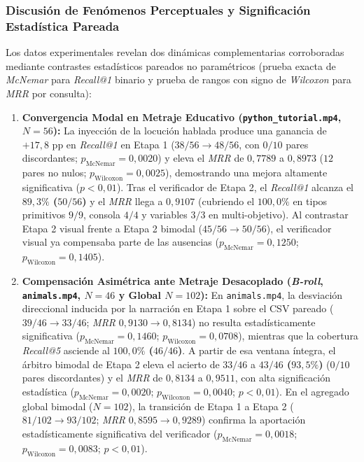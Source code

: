 \subsubsection{Discusión de Fenómenos Perceptuales y Significación Estadística Pareada}
Los datos experimentales revelan dos dinámicas complementarias corroboradas mediante contrastes estadísticos pareados no paramétricos (prueba exacta de \textit{McNemar} para \textit{Recall@1} binario y prueba de rangos con signo de \textit{Wilcoxon} para \textit{MRR} por consulta):
\begin{enumerate}
    \item \textbf{Convergencia Modal en Metraje Educativo (\texttt{python\_tutorial.mp4}, $N=56$):} La inyección de la locución hablada produce una ganancia de $+17,8\text{ pp}$ en \textit{Recall@1} en Etapa 1 ($38/56 \to 48/56$, con $0/10$ pares discordantes; \textbf{$p_{\text{McNemar}} = 0,0020$}) y eleva el \textit{MRR} de $0,7789$ a $0,8973$ ($12$ pares no nulos; \textbf{$p_{\text{Wilcoxon}} = 0,0025$}), demostrando una mejora altamente significativa ($p < 0,01$). Tras el verificador de Etapa 2, el \textit{Recall@1} alcanza el \textbf{$89,3\%$ ($50/56$)} y el \textit{MRR} llega a \textbf{$0,9107$} (cubriendo el $100,0\%$ en tipos primitivos $9/9$, consola $4/4$ y variables $3/3$ en multi-objetivo). Al contrastar Etapa 2 visual frente a Etapa 2 bimodal ($45/56 \to 50/56$), el verificador visual ya compensaba parte de las ausencias ($p_{\text{McNemar}} = 0,1250$; $p_{\text{Wilcoxon}} = 0,1405$).
    \item \textbf{Compensación Asimétrica ante Metraje Desacoplado (\textit{B-roll}, \texttt{animals.mp4}, $N=46$ y Global $N=102$):} En \texttt{animals.mp4}, la desviación direccional inducida por la narración en Etapa 1 sobre el CSV pareado ($39/46 \to 33/46$; \textit{MRR} $0,9130 \to 0,8134$) no resulta estadísticamente significativa ($p_{\text{McNemar}} = 0,1460$; $p_{\text{Wilcoxon}} = 0,0708$), mientras que la cobertura \textit{Recall@5} asciende al \textbf{$100,0\%$ ($46/46$)}. A partir de esa ventana íntegra, el árbitro bimodal de Etapa 2 eleva el acierto de $33/46$ a \textbf{$43/46$ ($93,5\%$)} ($0/10$ pares discordantes) y el \textit{MRR} de $0,8134$ a \textbf{$0,9511$}, con alta significación estadística (\textbf{$p_{\text{McNemar}} = 0,0020$}; \textbf{$p_{\text{Wilcoxon}} = 0,0040$}; $p < 0,01$). En el agregado global bimodal ($N=102$), la transición de Etapa 1 a Etapa 2 ($81/102 \to 93/102$; \textit{MRR} $0,8595 \to 0,9289$) confirma la aportación estadísticamente significativa del verificador (\textbf{$p_{\text{McNemar}} = 0,0018$}; \textbf{$p_{\text{Wilcoxon}} = 0,0083$}; $p < 0,01$).
\end{enumerate}

